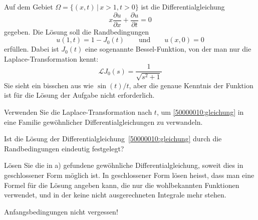 Auf dem Gebiet $\Omega=\{(x,t)\,|\, x>1,t > 0\}$
ist die Differentialgleichung
\begin{equation}
x\frac{\partial u}{\partial x}+\frac{\partial u}{\partial t}=0
\label{50000010:gleichung}
\end{equation}
gegeben. Die Lösung soll die Randbedingungen
\[
u(1,t)=1-J_0(t)
\qquad
\text{und}
\qquad
u(x,0)=0
\]
erfüllen.
Dabei ist $J_0(t)$ eine sogenannte Bessel-Funktion, von der man nur
die Laplace-Trans\-for\-ma\-tion kennt:
\[
\mathscr{L}J_0(s)=\frac1{\sqrt{s^2+1}}
\]
Sie sieht ein bisschen aus wie $\sin(t)/t$, aber die genaue Kenntnis der
Funktion ist für die Lösung der Aufgabe nicht erforderlich.
\begin{teilaufgaben}
\item Verwenden Sie die Laplace-Transformation nach $t$,
um \eqref{50000010:gleichung} in eine Familie gewöhnlicher
Differentialgleichungen zu verwandeln.
\item 
Ist die Lösung der Differentialgleichung~\eqref{50000010:gleichung} durch
die Randbedingungen eindeutig festgelegt?
\item
Lösen Sie die in a) gefundene gewöhnliche Differentialgleichung,
soweit dies in ge\-schlos\-se\-ner Form möglich ist.
In geschlossener Form
lösen heisst, dass man eine Formel für die Lösung angeben kann, die 
nur die wohlbekannten Funktionen verwendet, und in der keine nicht
ausgerechneten Integrale mehr stehen.
\end{teilaufgaben}

\begin{hinweis}
Anfangsbedingungen nicht vergessen!
\end{hinweis}

